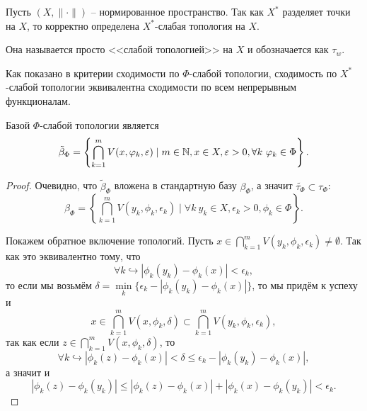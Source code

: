 \begin{definition}
    Пусть $(X, \|\cdot\|)$ -- нормированное пространство.
    Так как $X^*$ разделяет точки на $X$, то корректно определена $X^*$-слабая топология на $X$.

    Она называется просто <<слабой топологией>> на $X$ и обозначается как $\tau_{w}$.
\end{definition}
\begin{note}
    Как показано в критерии сходимости по $\Phi$-слабой топологии, сходимость по $X^*$-слабой топологии эквивалентна сходимости по всем непрерывным функционалам.
\end{note}
\begin{proposition}
    Базой $\Phi$-слабой топологии является
    \[
        \tilde{\beta}_{\Phi} = \left\{ \bigcap_{k = 1}^{m} V(x, \varphi_k, \varepsilon) \mid m\in \mathbb{N}, x \in X, \varepsilon > 0, \forall k \ \varphi_k \in \Phi\right\}.
    \]
\end{proposition}
\begin{proof}
    Очевидно, что $\tilde{\beta}_{\Phi}$ вложена в стандартную базу $\beta_{\Phi}$, а значит $\tilde{\tau_{\Phi}} \subset \tau_{\Phi}$:
    \[
        \beta_{\Phi} = \left\{\bigcap_{k = 1}^{m} V(y_k, \phi_k, \epsilon_k) \mid \forall k \ y_k \in X, \epsilon_k > 0, \phi_k \in \Phi \right\}.
    \]

    Покажем обратное включение топологий.
    Пусть $x \in \bigcap_{k = 1}^{m} V(y_k, \phi_k, \epsilon_k) \neq \emptyset$.
    Так как это эквивалентно тому, что
    \[
        \forall k \hookrightarrow |\phi_k(y_k) - \phi_k(x)| < \epsilon_k,
    \]
    то если мы возьмём $\delta = \min\limits_{k} \{\epsilon_k - |\phi_k(y_k) - \phi_k(x)|\}$, то мы придём к успеху и
    \[
        x \in \bigcap_{k = 1}^{m} V(x, \phi_k, \delta) \subset \bigcap_{k = 1}^{m} V(y_k, \phi_k, \epsilon_k),
    \]
    так как если $z \in \bigcap_{k = 1}^{m} V(x, \phi_k, \delta)$, то
    \[
        \forall k \hookrightarrow |\phi_k(z) - \phi_k(x)| < \delta \leq \epsilon_k - |\phi_k(y_k) - \phi_k(x)|,
    \]
    а значит и
    \[
        |\phi_k(z) - \phi_k(y_k)| \leq |\phi_k(z) - \phi_k(x)| + |\phi_k(x) - \phi_{k}(y_k)| < \epsilon_k.
    \]
\end{proof}
